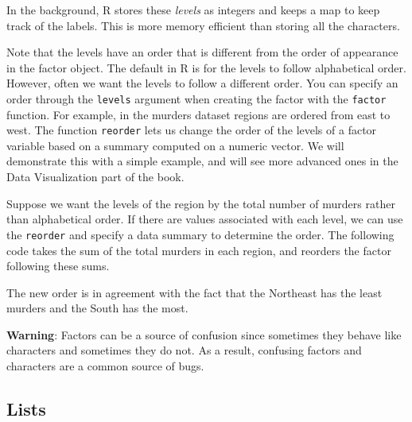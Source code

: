 \documentclass[
]{krantz}
\newenvironment{Shaded}{\begin{snugshade}}{\end{snugshade}}
\newcommand{\CommentTok}[1]{\textcolor[rgb]{0.37,0.37,0.37}{\textit{#1}}}
\newcommand{\DataTypeTok}[1]{\textcolor[rgb]{0.27,0.27,0.27}{#1}}
\newcommand{\KeywordTok}[1]{\textcolor[rgb]{0.27,0.27,0.27}{\textbf{#1}}}
\newcommand{\NormalTok}[1]{#1}
\newcommand{\OperatorTok}[1]{\textcolor[rgb]{0.43,0.43,0.43}{\textbf{#1}}}
\newcommand{\StringTok}[1]{\textcolor[rgb]{0.5,0.5,0.5}{#1}}
\begin{document}
In the background, R stores these \emph{levels} as integers and keeps a map to keep track of the labels. This is more memory efficient than storing all the characters.

Note that the levels have an order that is different from the order of appearance in the factor object. The default in R is for the levels to follow alphabetical order. However, often we want the levels to follow a different order. You can specify an order through the \texttt{levels} argument when creating the factor with the \texttt{factor} function. For example, in the murders dataset regions are ordered from east to west. The function \texttt{reorder} lets us change the order of the levels of a factor variable based on a summary computed on a numeric vector. We will demonstrate this with a simple example, and will see more advanced ones in the Data Visualization part of the book.

Suppose we want the levels of the region by the total number of murders rather than alphabetical order. If there are values associated with each level, we can use the \texttt{reorder} and specify a data summary to determine the order. The following code takes the sum of the total murders in each region, and reorders the factor following these sums.

\begin{Shaded}
\end{Shaded}

The new order is in agreement with the fact that the Northeast has the least murders and the South has the most.

\textbf{Warning}: Factors can be a source of confusion since sometimes they behave like characters and sometimes they do not. As a result, confusing factors and characters are a common source of bugs.

\hypertarget{lists}{%
\subsection{Lists}\label{lists}}
\end{document}
